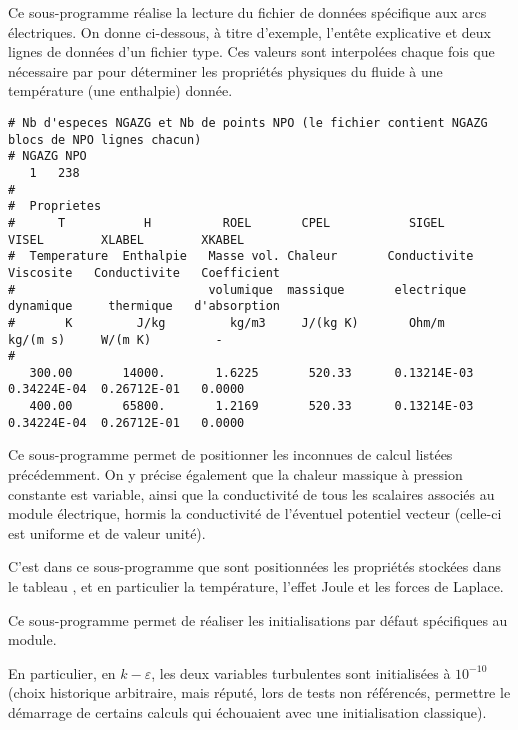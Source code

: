 
Ce sous-programme r\'ealise la lecture du fichier de donn\'ees sp\'ecifique
aux arcs \'electriques. On donne ci-dessous, \`a titre d'exemple, l'ent\^ete
explicative et deux lignes de donn\'ees d'un fichier type. Ces valeurs sont interpol\'ees chaque
fois que n\'ecessaire par  pour d\'eterminer les propri\'et\'es
physiques du fluide \`a une temp\'erature (une enthalpie) donn\'ee.   
 
{\scriptsize
\begin{verbatim}
# Nb d'especes NGAZG et Nb de points NPO (le fichier contient NGAZG blocs de NPO lignes chacun)
# NGAZG NPO 
   1   238
#
#  Proprietes
#      T           H          ROEL       CPEL           SIGEL        VISEL        XLABEL        XKABEL
#  Temperature  Enthalpie   Masse vol. Chaleur       Conductivite  Viscosite   Conductivite   Coefficient  
#                           volumique  massique       electrique   dynamique     thermique   d'absorption  
#       K         J/kg         kg/m3     J/(kg K)       Ohm/m        kg/(m s)     W/(m K)         -
#
   300.00       14000.       1.6225       520.33      0.13214E-03  0.34224E-04  0.26712E-01   0.0000     
   400.00       65800.       1.2169       520.33      0.13214E-03  0.34224E-04  0.26712E-01   0.0000     
\end{verbatim}
}



Ce sous-programme permet de positionner les inconnues de calcul list\'ees 
pr\'ec\'edemment. On y pr\'ecise \'egalement que la chaleur massique \`a
pression constante est variable, ainsi que la conductivit\'e de tous les
scalaires associ\'es au module \'electrique, hormis la conductivit\'e de
l'\'eventuel potentiel vecteur (celle-ci est uniforme et de valeur unit\'e). 
 


C'est dans ce sous-programme que sont positionn\'ees les propri\'et\'es stock\'ees
dans le tableau , et en particulier la temp\'erature, l'effet Joule
et les forces de Laplace. 


Ce sous-programme permet de r\'ealiser les initialisations par d\'efaut
sp\'ecifiques au module. 

En particulier, en $k-\varepsilon$, les deux variables
turbulentes sont initialis\'ees \`a $10^{-10}$ (choix historique arbitraire,
mais r\'eput\'e, lors de tests non r\'ef\'erenc\'es, permettre le d\'emarrage de
certains calculs qui \'echouaient avec une initialisation classique). 

